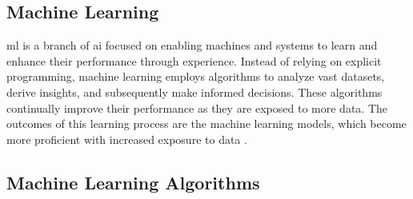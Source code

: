 \subsection{Machine Learning}
\gls{ml} is a branch of \gls{ai} focused on enabling machines and systems to learn and enhance their performance through experience. 
Instead of relying on explicit programming, machine learning employs algorithms to analyze vast datasets, derive insights, and subsequently make informed decisions. 
These algorithms continually improve their performance as they are exposed to more data. The outcomes of this learning process are the machine learning models, which become more proficient with increased exposure to data \citep{google_2021_what}.

\subsection{Machine Learning Algorithms}
